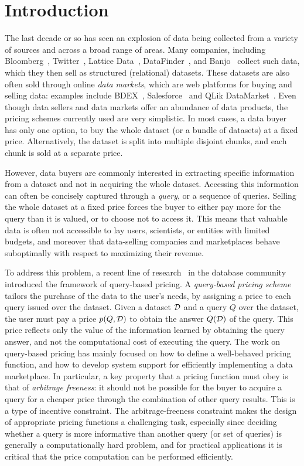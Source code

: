 \section{Introduction}
\label{sec:intro}

The last decade or so has seen an explosion of data being collected from a variety of sources and across a broad range of areas. Many companies, including Bloomberg~\cite{bloomberg}, Twitter~\cite{twitterapi}, Lattice Data~\cite{lattice}, DataFinder~\cite{datafinder}, and Banjo~\cite{banjo} collect such data, which they then sell as structured (relational) datasets. 
These datasets are also often sold through online {\em data markets}, which are web platforms for buying and selling data: examples include BDEX~\cite{bdex}, Salesforce~\cite{salesforce} and QLik DataMarket~\cite{qlik}. Even though data sellers and data markets offer an abundance of data products, the pricing schemes currently used are very simplistic. In most cases, a data buyer has only one option, to buy the whole dataset (or a bundle of datasets) at a fixed price. Alternatively, the dataset is split into multiple disjoint chunks, and each chunk is sold at a separate price. 

However, data buyers are commonly interested in extracting specific information from a dataset and not in acquiring the whole dataset. Accessing this information can often be concisely captured through a {\em query}, or a sequence of queries. Selling the whole dataset at a fixed price forces the buyer to either pay more for the query than it is valued, or to choose not to access it. This means that valuable data is often not accessible to lay users, scientists, or entities with limited budgets, and moreover that data-selling companies and marketplaces behave suboptimally with respect to maximizing their revenue.

To address this problem, a recent line of research~\cite{KUBHS12,KUBHS13,deep2017qirana} in the database community introduced the framework of query-based pricing. A {\em query-based pricing scheme} tailors the purchase of the data to the user's needs, by assigning a price to each query issued over the dataset. Given a dataset $\mathcal{D}$ and a query $Q$ over the dataset, the user must pay a price $p(Q,\mathcal{D})$ to obtain the answer $Q(\mathcal{D})$ of the query. This price reflects only the value of the information learned by obtaining the query answer, and not the computational cost of executing the query. The work on query-based pricing has mainly focused on how to define a well-behaved pricing function, and how to develop system support for efficiently implementing a data marketplace.
In particular, a key property that a pricing function must obey is that of {\em arbitrage freeness}: it should not be possible for the buyer to acquire a query for a cheaper price through the combination of other query results. This is a type of incentive constraint. The arbitrage-freeness constraint makes the design of appropriate pricing functions a challenging task, especially since deciding whether a query is more informative than another query (or set of queries) is generally a computationally hard problem, and for practical applications it is critical that the price computation can be performed efficiently.

